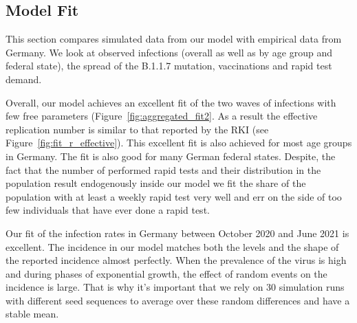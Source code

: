 \subsection{Model Fit}
\label{subsec:fit_results}

This section compares simulated data from our model with empirical data from Germany. We
look at observed infections (overall as well as by age group and federal state), the
spread of the B.1.1.7 mutation, vaccinations and rapid test
demand.

Overall, our model achieves an excellent fit of the two waves of infections with few free
parameters (Figure~\ref{fig:aggregated_fit2}. As a result the effective replication
number is similar to that reported by the RKI (see Figure~\ref{fig:fit_r_effective}).
This excellent fit is also achieved for most age groups in Germany. The fit is also good
for many German federal states. Despite, the fact that the number of performed rapid
tests and their distribution in the population result endogenously inside our model we
fit the share of the population with at least a weekly rapid test very well and err on
the side of too few individuals that have ever done a rapid test.

Our fit of the infection rates in Germany between October 2020 and June 2021 is
excellent. The incidence in our model matches both the levels and the shape of the
reported incidence almost perfectly. When the prevalence of the virus is high and during
phases of exponential growth, the effect of random events on the incidence is large. That
is why it's important that we rely on 30 simulation runs with different seed sequences to
average over these random differences and have a stable mean.

